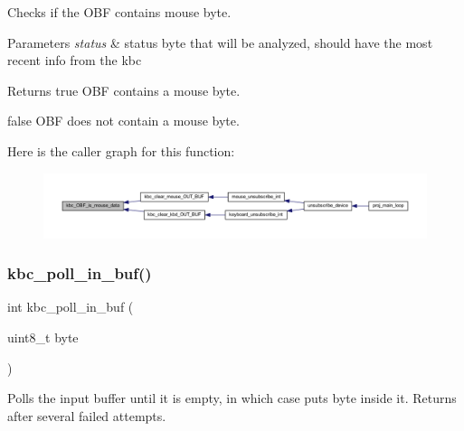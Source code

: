 Checks if the O\+BF contains mouse byte. 


\begin{DoxyParams}{Parameters}
{\em status} & status byte that will be analyzed, should have the most recent info from the kbc \\
\hline
\end{DoxyParams}
\begin{DoxyReturn}{Returns}
true O\+BF contains a mouse byte. 

false O\+BF does not contain a mouse byte. 
\end{DoxyReturn}
Here is the caller graph for this function\+:\nopagebreak
\begin{figure}[H]
\begin{center}
\leavevmode
\includegraphics[width=350pt]{group__keyboard_ga559aca235f02f3322fe738495efdd0e0_icgraph}
\end{center}
\end{figure}
\mbox{\label{group__keyboard_ga26b9ea576b6e214c7748979568e97c7c}} 
\subsubsection{\texorpdfstring{kbc\+\_\+poll\+\_\+in\+\_\+buf()}{kbc\_poll\_in\_buf()}}
{\footnotesize\ttfamily int kbc\+\_\+poll\+\_\+in\+\_\+buf (\begin{DoxyParamCaption}\item[{uint8\+\_\+t}]{byte }\end{DoxyParamCaption})}



Polls the input buffer until it is empty, in which case puts byte inside it. Returns after several failed attempts. 


